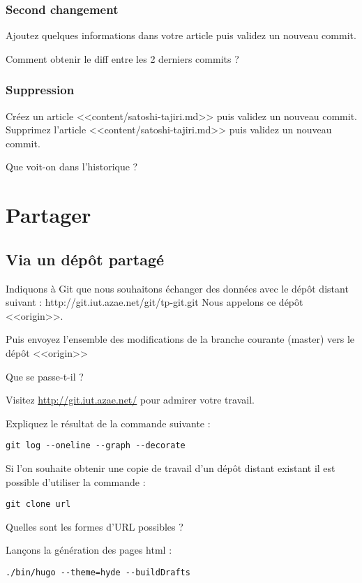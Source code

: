 \documentclass[a4paper]{article}
\begin{document}
\subsubsection{Second changement}
Ajoutez quelques informations dans votre article puis validez un nouveau commit.

Comment obtenir le diff entre les 2 derniers commits ?

\subsubsection{Suppression}
Créez un article <<content/satoshi-tajiri.md>> puis validez un nouveau commit. 
Supprimez l'article <<content/satoshi-tajiri.md>> puis validez un nouveau commit. 

Que voit-on dans l'historique ?

\section{Partager}

\subsection{Via un dépôt partagé}

Indiquons à Git que nous souhaitons échanger des données avec le dépôt distant suivant : http://git.iut.azae.net/git/tp-git.git
Nous appelons ce dépôt <<origin>>.

Puis envoyez l'ensemble des modifications de la branche courante (master) vers le dépôt <<origin>>

Que se passe-t-il ?

Visitez \url{http://git.iut.azae.net/} pour admirer votre travail.

Expliquez le résultat de la commande suivante : 
\begin{verbatim}
git log --oneline --graph --decorate
\end{verbatim}

Si l'on souhaite obtenir une copie de travail d'un dépôt distant existant il est possible d'utiliser la commande :
\begin{verbatim}
git clone url
\end{verbatim}

Quelles sont les formes d'URL possibles ?

Lançons la génération des pages html : 
\begin{verbatim}
./bin/hugo --theme=hyde --buildDrafts
\end{verbatim}
\end{document}
